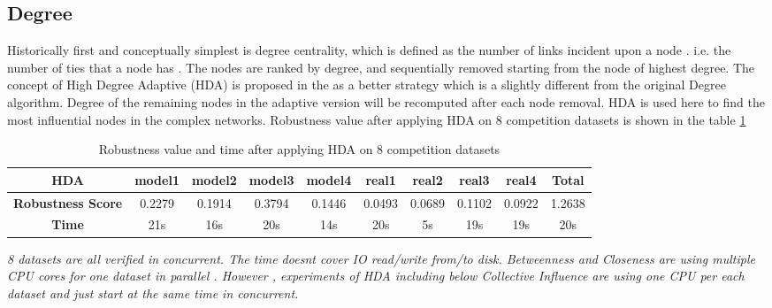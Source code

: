 \documentclass{article}
\begin{document}
	\subsection{Degree}		

	Historically first and conceptually simplest is degree centrality, which is defined as the number of links incident upon a node . i.e. the number of ties that a node has \cite{wikiCentrality}. The nodes are ranked by degree, and sequentially removed starting from the node of highest degree. The concept of High Degree Adaptive (HDA) is proposed in the \cite{morone2015influence} as a better strategy which is a slightly different from the original Degree algorithm. Degree of the remaining nodes in the adaptive version will be recomputed after each node removal. HDA is used here to find the most influential nodes in the complex networks. Robustness value after applying HDA on 8 competition datasets is shown in the table \ref{tab:table5}
	

		
	\begin{table}[!htbp]
		\begin{adjustwidth}{-1.3cm}{}		
			\begin{threeparttable}
				\centering
				\caption{Robustness value and time after applying HDA on 8 competition datasets}
				\label{tab:table5}
				
				\begin{tabular}{|c|c|c|c|c|c|c|c|c|c|}
					\hline
					\textbf{HDA}          & \textbf{model1} & \textbf{model2} & \textbf{model3} & \textbf{model4} & \textbf{real1} & \textbf{real2} & \textbf{real3} & \textbf{real4} & \textbf{Total} \\ \hline
					\textbf{Robustness Score} & 0.2279          & 0.1914          & 0.3794          & 0.1446          & 0.0493         & 0.0689         & 0.1102         & 0.0922         & 1.2638         \\ \hline
					\textbf{Time}     & 21s             & 16s             & 20s             & 14s             & 20s            & 5s             & 19s            & 19s            & 20s            \\ \hline					
				\end{tabular}
				\begin{tablenotes}
					\small
					\item\textit{8 datasets are all verified in concurrent. The time doesn\textquotesingle t cover IO read/write from/to disk. Betweenness and Closeness are using multiple CPU cores for one dataset in parallel . However , experiments of HDA including below Collective Influence are using one CPU per each dataset and just start at the same time in concurrent.}
				\end{tablenotes}			
			\end{threeparttable}
		\end{adjustwidth}
	\end{table}
	
\end{document}
